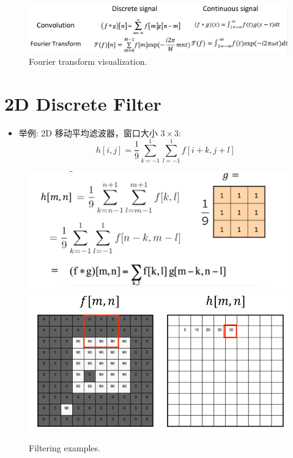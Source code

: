 \begin{figure}[htbp]
    \centering
    \includegraphics[scale=0.18]{figures/FourierTransform.png}
    \caption{Fourier transform visualization.}
\end{figure}

\clearpage

\section{2D Discrete Filter}
\begin{itemize}
    \item 举例: 2D 移动平均滤波器，窗口大小 $ 3 \times 3 $:
    $$
    h[i,j] = \frac{1}{9} \sum_{k=-1}^{1} \sum_{l=-1}^{1} f[i+k, j+l]
    $$
\end{itemize}

\begin{figure}[htbp]
    \centering
    \includegraphics[scale=0.25]{figures/g.png}
    \includegraphics[scale=0.25]{figures/g2.png}
    \caption{Filtering examples.}
\end{figure}

